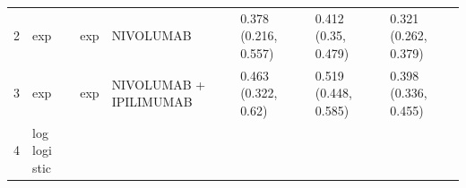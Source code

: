 \documentclass[
]{article}
\begin{document}
\begin{longtable}[]{@{}lllllll@{}}
\begin{minipage}[t]{0.04\columnwidth}
2\strut
\end{minipage} & \begin{minipage}[t]{0.08\columnwidth}\raggedright
exp\strut
\end{minipage} & \begin{minipage}[t]{0.08\columnwidth}\raggedright
exp\strut
\end{minipage} & \begin{minipage}[t]{0.15\columnwidth}\raggedright
NIVOLUMAB\strut
\end{minipage} & \begin{minipage}[t]{0.15\columnwidth}\raggedright
0.378 (0.216, 0.557)\strut
\end{minipage} & \begin{minipage}[t]{0.15\columnwidth}\raggedright
0.412 (0.35, 0.479)\strut
\end{minipage} & \begin{minipage}[t]{0.16\columnwidth}\raggedright
0.321 (0.262, 0.379)\strut
\end{minipage}\tabularnewline
\begin{minipage}[t]{0.04\columnwidth}\raggedright
3\strut
\end{minipage} & \begin{minipage}[t]{0.08\columnwidth}\raggedright
exp\strut
\end{minipage} & \begin{minipage}[t]{0.08\columnwidth}\raggedright
exp\strut
\end{minipage} & \begin{minipage}[t]{0.15\columnwidth}\raggedright
NIVOLUMAB + IPILIMUMAB\strut
\end{minipage} & \begin{minipage}[t]{0.15\columnwidth}\raggedright
0.463 (0.322, 0.62)\strut
\end{minipage} & \begin{minipage}[t]{0.15\columnwidth}\raggedright
0.519 (0.448, 0.585)\strut
\end{minipage} & \begin{minipage}[t]{0.16\columnwidth}\raggedright
0.398 (0.336, 0.455)\strut
\end{minipage}\tabularnewline
\begin{minipage}[t]{0.04\columnwidth}\raggedright
4\strut
\end{minipage} & \begin{minipage}[t]{0.08\columnwidth}\raggedright
log logi stic\strut
\end{minipage} & \begin{minipage}[t]{0.08\columnwidth}\raggedright

\end{minipage}
\end{longtable}
\end{document}

